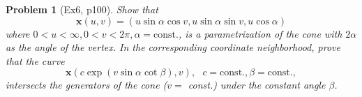 \documentclass[10pt,a4paper]{article}
\newcounter{theProblemCounter}
\newtheorem{problem}[theProblemCounter]{Problem}
\begin{document}
\newcommand{\mat}[7]{ \left[\begin{array}{cc}#1 & #2\end{array}\right]\left[\begin{array}{cc}#5 & #6 \\ #6 & #7\end{array}\right]\left[\begin{array}{c}#3 \\ #4\end{array}\right] }
\newcommand{\matnl}[7]{ \left[\begin{array}{cc}#1 & #2\end{array}\right]\left[\begin{array}{cc}#5 & #6 \\ #6 & #7\end{array}\right]\\&\left[\begin{array}{c}#3 \\ #4\end{array}\right] }
\setcounter{theProblemCounter}{5}
\begin{problem}[Ex6, p100]
Show that
\[ \mathbf{x}(u, v) = (u\sin\alpha\cos v, u\sin\alpha\sin v, u\cos\alpha)
\]
where $0<u<\infty, 0<v<2\pi, \alpha=\mbox{const.}$,
is a parametrization of the cone with $2\alpha$ as the angle of the vertex. In the corresponding coordinate neighborhood, prove that the curve
\[
\mathbf{x}(c\exp(v\sin\alpha \cot \beta), v),\ \ \ c=\mbox{const.}, \beta = \mbox{const.},
\]
intersects the generators of the cone ($v=$ const.) under the constant angle $\beta$.
\end{problem}
\end{document}
